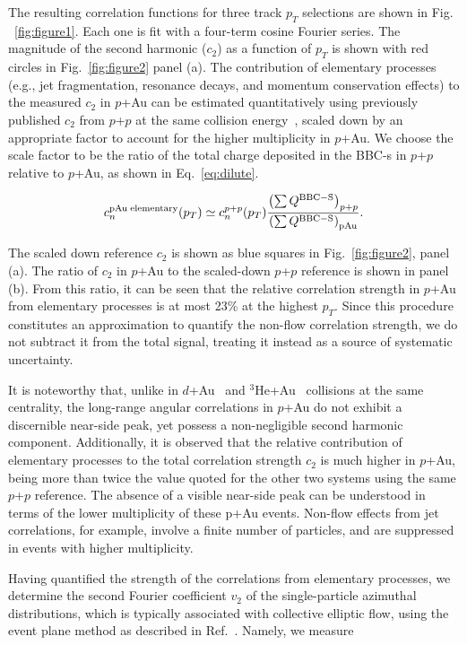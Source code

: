 \documentclass[%
reprint,
showpacs,preprintnumbers,
 amsmath,amssymb,
 aps,
]{revtex4-1}
\newcommand{\pt}{\mbox{$p_T$}\xspace}
\newcommand{\dau}{\mbox{$d$+Au}\xspace}
\newcommand{\pau}{\mbox{$p$+Au}\xspace}
\newcommand{\hau}{\mbox{$^3\text{He}$+Au}\xspace}
\newcommand{\pp}{\mbox{$p$+$p$}\xspace}
\begin{document}
The resulting correlation functions for three track \pt selections are shown in Fig. ~\ref{fig:figure1}. Each one is fit with a four-term cosine Fourier series. The magnitude of the second harmonic ($c_{2}$) as a function of \pt is shown with red circles in Fig.~\ref{fig:figure2} panel (a). The contribution of elementary processes (e.g., jet fragmentation, resonance decays, and momentum conservation effects) to the measured $c_2$ in \pau can be estimated quantitatively using previously published $c_2$ from \pp at the same collision energy~\cite{Adare:2015ctn}, scaled down by an appropriate factor to account for the higher multiplicity in \pau. We choose the scale factor to be the ratio of the total charge deposited in the BBC-s in \pp relative to \pau, as shown in Eq.~\ref{eq:dilute}. 

\begin{equation}
c_{n}^{{\rm pAu \; elementary}}(p_{T}) \simeq c_{n}^{p+p}(p_{T})
\frac{\left( \sum Q^{{\rm BBC-S}} \right)_{p+p}}
{\left( \sum Q^{{\rm BBC-S}} \right)_{{\rm pAu}}
}.
\label{eq:dilute}
\end{equation}

The scaled down reference $c_{2}$ is shown as blue squares in Fig.~\ref{fig:figure2}, panel (a). The ratio of $c_2$ in \pau to the scaled-down \pp reference is shown in panel (b). From this ratio, it can be seen that the relative correlation strength in \pau from elementary processes is at most 23\% at the highest \pt. Since this procedure constitutes an approximation to quantify the non-flow correlation strength, we do not subtract it from the total signal, treating it instead as a source of systematic uncertainty.

It is noteworthy that, unlike in \dau~\cite{adare_measurement_2014} and \hau~\cite{PhysRevLett.115.142301} collisions at the same centrality, the long-range angular correlations in \pau do not exhibit a discernible near-side peak, yet possess a non-negligible second harmonic component. Additionally, it is observed that the relative contribution of elementary processes to the total correlation strength $c_2$ is much higher in \pau, being more than twice the value quoted for the other two systems using the same \pp reference. The absence of a visible near-side peak can be understood in terms of the lower multiplicity of these p+Au events. Non-flow effects from jet correlations, for example, involve a finite number of particles, and are suppressed in events with higher multiplicity.

Having quantified the strength of the correlations from elementary processes, we determine the second Fourier coefficient $v_2$ of the single-particle azimuthal distributions, which is typically associated with collective elliptic flow, using the event plane method as described in Ref.~\cite{Poskanzer:1998yz}. Namely, we measure 
\end{document}
